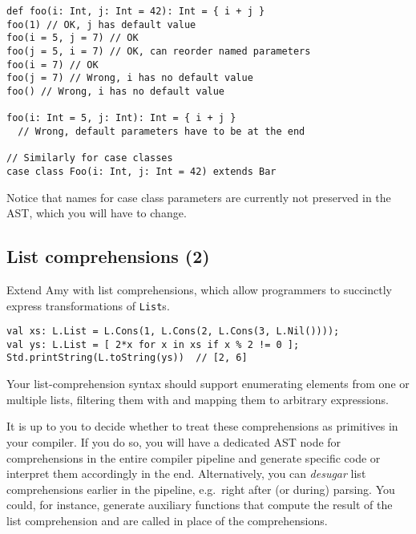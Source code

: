 \begin{lstlisting}
def foo(i: Int, j: Int = 42): Int = { i + j }
foo(1) // OK, j has default value
foo(i = 5, j = 7) // OK
foo(j = 5, i = 7) // OK, can reorder named parameters
foo(i = 7) // OK
foo(j = 7) // Wrong, i has no default value
foo() // Wrong, i has no default value

foo(i: Int = 5, j: Int): Int = { i + j }
  // Wrong, default parameters have to be at the end

// Similarly for case classes
case class Foo(i: Int, j: Int = 42) extends Bar
\end{lstlisting}

Notice that names for case class parameters are currently not preserved in the AST,
which you will have to change.


\subsection{List comprehensions (2)}

Extend Amy with list comprehensions, which allow programmers to succinctly express
transformations of \lstinline{List}s.

\begin{lstlisting}
val xs: L.List = L.Cons(1, L.Cons(2, L.Cons(3, L.Nil())));
val ys: L.List = [ 2*x for x in xs if x % 2 != 0 ];
Std.printString(L.toString(ys))  // [2, 6]
\end{lstlisting}

Your list-comprehension syntax should support enumerating elements from one or
multiple lists, filtering them with and mapping them to arbitrary expressions.

It is up to you to decide whether to treat these comprehensions as primitives in your compiler.
If you do so, you will have a dedicated AST node for comprehensions in the entire compiler
pipeline and generate specific code or interpret them accordingly in the end.
Alternatively, you can \emph{desugar} list comprehensions earlier in the pipeline, e.g.\ 
right after (or during) parsing.  You could, for instance, generate auxiliary functions that
compute the result of the list comprehension and are called in place of the comprehensions.

